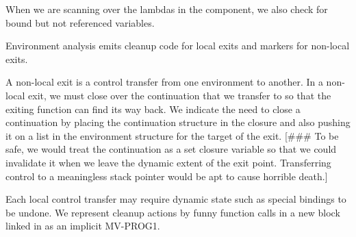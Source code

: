 When we are scanning over the lambdas in the component, we also check for bound
but not referenced variables.

Environment analysis emits cleanup code for local exits and markers for
non-local exits.

A non-local exit is a control transfer from one environment to another.  In a
non-local exit, we must close over the continuation that we transfer to so that
the exiting function can find its way back.  We indicate the need to close a
continuation by placing the continuation structure in the closure and also
pushing it on a list in the environment structure for the target of the exit.
[\#\#\# To be safe, we would treat the continuation as a set closure variable so
that we could invalidate it when we leave the dynamic extent of the exit point.
Transferring control to a meaningless stack pointer would be apt to cause
horrible death.]

Each local control transfer may require dynamic state such as special bindings
to be undone.  We represent cleanup actions by funny function calls in a new
block linked in as an implicit MV-PROG1.

